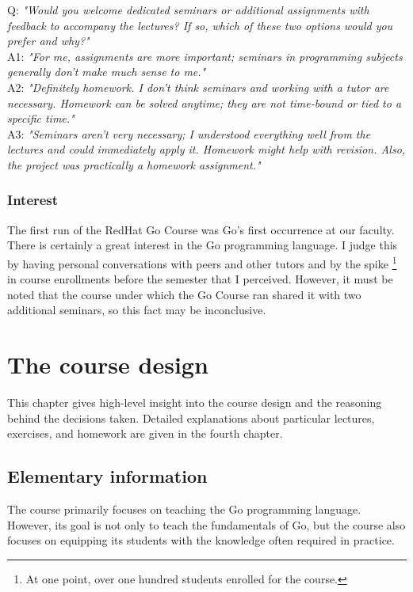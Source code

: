 \documentclass[
  digital,
  color,
  oneside,
  nosansbold,
  nocolorbold,
  lof,
  lot,
]{fithesis4}
\begin{document}
Q: \textit{
"Would you welcome dedicated seminars or additional assignments with feedback to accompany the lectures? If so, which of these two options would you prefer and why?"} \\

A1: \textit{"For me, assignments are more important; seminars in programming subjects generally don't make much sense to me."} \\

A2: \textit{"Definitely homework. I don't think seminars and working with a tutor are necessary. Homework can be solved anytime; they are not time-bound or tied to a specific time."} \\

A3: \textit{"Seminars aren't very necessary; I understood everything well from the lectures and could immediately apply it. Homework might help with revision. Also, the project was practically a homework assignment."}

\subsection{Interest}

The first run of the RedHat Go Course was Go's first occurrence at our faculty. There is certainly a great interest in the Go programming language. I judge this by having personal conversations with peers and other tutors and by the spike \footnote{At one point, over one hundred students enrolled for the course.}
in course enrollments before the semester that I perceived. However, it must be noted that the course under which the Go Course ran shared it with two additional seminars, so this fact may be inconclusive.

\chapter{The course design}

This chapter gives high-level insight into the course design and the reasoning behind the decisions taken. Detailed explanations about particular lectures, exercises, and homework are given in the fourth chapter.

\section{Elementary information}

The course primarily focuses on teaching the Go programming language. However, its goal is not only to teach the fundamentals of Go, but the course also focuses on equipping its students with the knowledge often required in practice.
\end{document}

